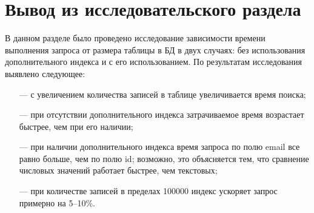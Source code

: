 \newpage
\section{Вывод из исследовательского раздела}
В данном разделе было проведено исследование зависимости времени выполнения запроса от размера таблицы в БД в двух случаях: без использования дополнительного индекса и с его использованием.
По результатам исследования выявлено следующее:
\begin{itemize}
	\item[---] с увеличением количества записей в таблице увеличивается время поиска;
	\item[---] при отсутствии дополнительного индекса затрачиваемое время возрастает быстрее, чем при его наличии;
	\item[---] при наличии дополнительного индекса время запроса по полю email все равно больше, чем по полю id; возможно, это объясняется тем, что сравнение числовых значений работает быстрее, чем текстовых;
	\item[---] при количестве записей в пределах 100000 индекс ускоряет запрос примерно на 5--10\%.
\end{itemize}
